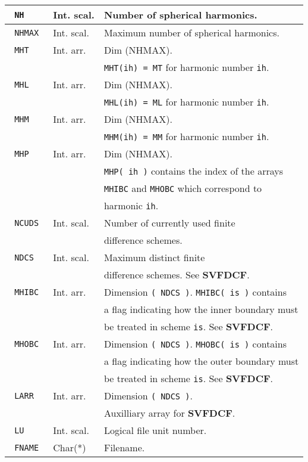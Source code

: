 \begin{tabular}{|l|l|l|}
\hline
\verb+ NH + & Int. scal. & Number of spherical harmonics. \\
\hline
\verb+ NHMAX + & Int. scal. & Maximum number of spherical harmonics. \\
\hline
\verb+ MHT + & Int. arr. & Dim (NHMAX). \\
& & \verb+MHT(ih) = MT+ for harmonic number \verb+ih+. \\
\hline
\verb+ MHL + & Int. arr. & Dim (NHMAX). \\
& & \verb+MHL(ih) = ML+ for harmonic number \verb+ih+. \\
\hline
\verb+ MHM + & Int. arr. & Dim (NHMAX). \\
& & \verb+MHM(ih) = MM+ for harmonic number \verb+ih+. \\
\hline
\verb+ MHP + & Int. arr. & Dim (NHMAX). \\
& & \verb+MHP( ih )+ contains the index of the arrays \\
& & \verb+MHIBC+ and \verb+MHOBC+ which correspond to \\
& & harmonic \verb+ih+. \\
\hline
\verb+ NCUDS + & Int. scal. & Number of currently used finite \\
& & difference schemes. \\
\hline
\verb+ NDCS + & Int. scal. & Maximum distinct finite \\
& & difference schemes. See {\bf SVFDCF}. \\
\hline
\verb+ MHIBC + & Int. arr. & Dimension \verb+( NDCS )+. \verb+MHIBC( is )+
contains \\
& & a flag indicating how the inner boundary must \\
& & be treated in scheme \verb+is+. See {\bf SVFDCF}. \\
\hline
\verb+ MHOBC + & Int. arr. & Dimension \verb+( NDCS )+. \verb+MHOBC( is )+
contains \\
& & a flag indicating how the outer boundary must \\
& & be treated in scheme \verb+is+. See {\bf SVFDCF}. \\
\hline
\verb+ LARR + & Int. arr. & Dimension \verb+( NDCS )+. \\
& & Auxilliary array for {\bf SVFDCF}. \\
\hline
\verb+ LU + & Int. scal. & Logical file unit number. \\
\hline
\verb+ FNAME + & Char(*) & Filename. \\
\hline
\end{tabular} \newline

